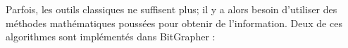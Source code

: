 Parfois, les outils classiques ne suffisent plus; il y a alors besoin d'utiliser des méthodes mathématiques poussées pour obtenir de l'information. Deux de ces algorithmes sont implémentés dans BitGrapher :